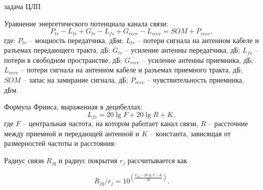 \begin{frame}
    {задача ЦЛП}
    \begin{minipage}[t]{1\linewidth}
        \fontsize{8pt}{7.2}\selectfont
        Уравнение энергетического потенциала канала связи:
        $$
        P_{tr} - L_{tr} + G_{tr} - L_{fs} + G_{recv} - L_{recv} = SOM + P_{recv},
        $$
        где: $P_{tr}$ -- мощность передатчика, дБм; $L_{tr}$ -- потери сигнала на антенном кабеле и разъемах передающего тракта, дБ; $G_{tr}$ -- усиление антенны передатчика, дБ; $L_{fs}$ -- потери в свободном пространстве, дБ; $G_{recv}$ -- усиление антенны приемника, дБ; $L_{recv}$ -- потери сигнала на антенном кабеле и разъемах приемного тракта, дБ; $SOM$ -- запас на замирание сигнала, дБ; $P_{recv}$ -- чувствительность приемника, дБм.

        \bigskip
        Формула Фрииса, выраженная в децибеллах:
        $$
        \label{eq:part3_L_fs}
        L_{fs} = 20 \lg{F} + 20\lg{R} + K,
        $$
        где $F$ -- центральная частота, на котором работает канал связи, $R$ -- рассточние между приемной и передающей антенной и $K$ -- константа, зависящая от размерностей частоты и расстояния:
        
        \bigskip
        Радиус связи $R_{jq}$  и радиус покрытия $r_j$ рассчитывается как

        $$
        R_{jq} / r_j = 10^{\left(\frac{L_{fs} - 20\lg{F} - K}{20}\right)}.
        $$
    \end{minipage}

\end{frame}


